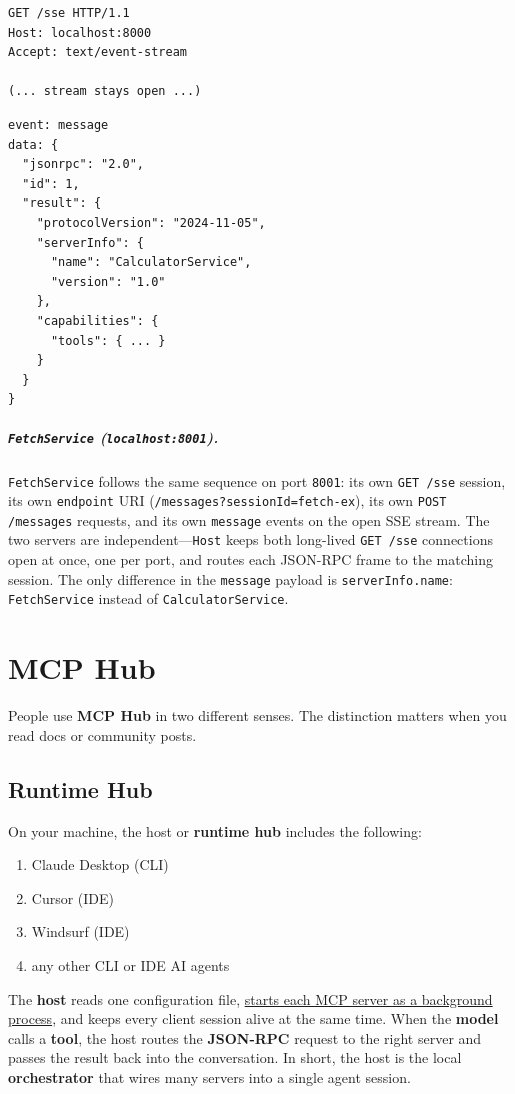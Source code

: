 \begin{httpexchange}
\begin{lstlisting}[style=http]
GET /sse HTTP/1.1
Host: localhost:8000
Accept: text/event-stream

(... stream stays open ...)
\end{lstlisting}
\httpmidarrows
\begin{lstlisting}[style=http]
event: message
data: {
  "jsonrpc": "2.0",
  "id": 1,
  "result": {
    "protocolVersion": "2024-11-05",
    "serverInfo": {
      "name": "CalculatorService",
      "version": "1.0"
    },
    "capabilities": {
      "tools": { ... }
    }
  }
}
\end{lstlisting}
\end{httpexchange}



\subparagraph{\texttt{FetchService} (\texttt{localhost:8001}).}
\texttt{FetchService} follows the same sequence on port \texttt{8001}: its own \texttt{GET /sse} session, its own \texttt{endpoint} URI (\texttt{/messages?sessionId=fetch-ex}), its own \texttt{POST /messages} requests, and its own \texttt{message} events on the open SSE stream.
The two servers are independent---\texttt{Host} keeps both long-lived \texttt{GET /sse} connections open at once, one per port, and routes each JSON-RPC frame to the matching session.
The only difference in the \texttt{message} payload is \texttt{serverInfo.name}: \texttt{FetchService} instead of \texttt{CalculatorService}.








\newpage

\section{MCP Hub}
People use \textbf{MCP Hub} in two different senses. The distinction matters when you read docs or community posts.
\subsection{Runtime Hub}
On your machine, the host or \textbf{runtime hub} includes the following:
\begin{enumerate}
    \item Claude Desktop (CLI)
    \item Cursor (IDE)
    \item Windsurf (IDE)
    \item any other CLI or IDE AI agents
\end{enumerate}
The \textbf{host} reads one configuration file, \uline{starts each MCP server as a background process}, 
and keeps every client session alive at the same time.
When the \textbf{model} calls a \textbf{tool}, the host routes the \textbf{JSON-RPC} request to the right server and passes the result back into the conversation.
In short, the host is the local \textbf{orchestrator} that wires many servers into a single agent session.
